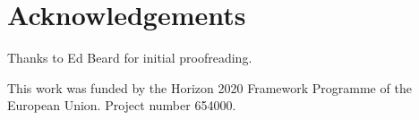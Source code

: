 \documentclass[jnr]{iosart2x}
\begin{document}
\section{Acknowledgements}
\label{Acknowledgements}

Thanks to Ed Beard for initial proofreading.

This work was funded by the Horizon 2020 Framework Programme of the European Union.
Project number 654000.



\nocite{*}


\end{document}
